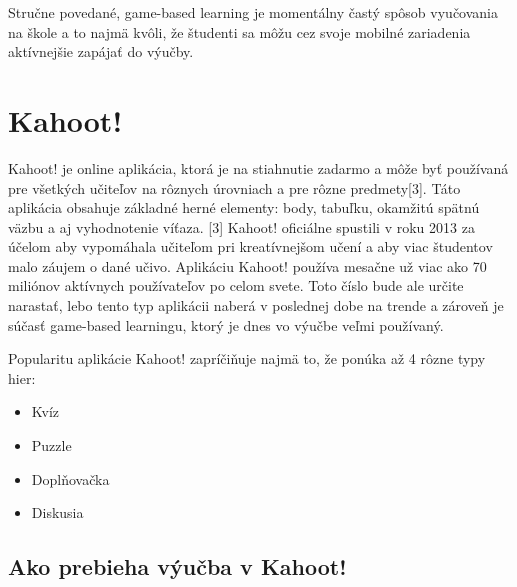 \documentclass[10pt,oneside,slovak,a4paper]{article}
\begin{document}
	Stručne povedané, game-based learning je momentálny častý spôsob vyučovania na škole a to najmä kvôli, že študenti sa môžu cez svoje mobilné zariadenia aktívnejšie zapájať do výučby.



\section{Kahoot!} \label{ina}
Kahoot! je online aplikácia, ktorá je na stiahnutie zadarmo a môže byť používaná pre všetkých učiteľov na rôznych úrovniach a pre rôzne predmety[3]. Táto aplikácia obsahuje základné herné  elementy: body, tabuľku, okamžitú spätnú väzbu a aj vyhodnotenie víťaza. [3] Kahoot! oficiálne spustili v roku 2013 za účelom aby vypomáhala učiteľom pri kreatívnejšom učení a aby viac študentov malo záujem o dané učivo.  Aplikáciu Kahoot! používa mesačne už viac ako 70 miliónov aktívnych používateľov po celom svete\cite{Licorish}. Toto číslo bude ale určite narastať, lebo tento typ aplikácii naberá v poslednej dobe na trende a zároveň je súčasť game-based learningu, ktorý je dnes vo výučbe veľmi používaný. 


Popularitu aplikácie Kahoot! zapríčiňuje najmä to, že ponúka až 4 rôzne typy hier\cite{Licorish}:
\begin{itemize}
\item	Kvíz
\item	Puzzle
\item	Doplňovačka
\item	Diskusia


\end {itemize}
\subsection{Ako prebieha výučba v Kahoot!} 
\end{document}
